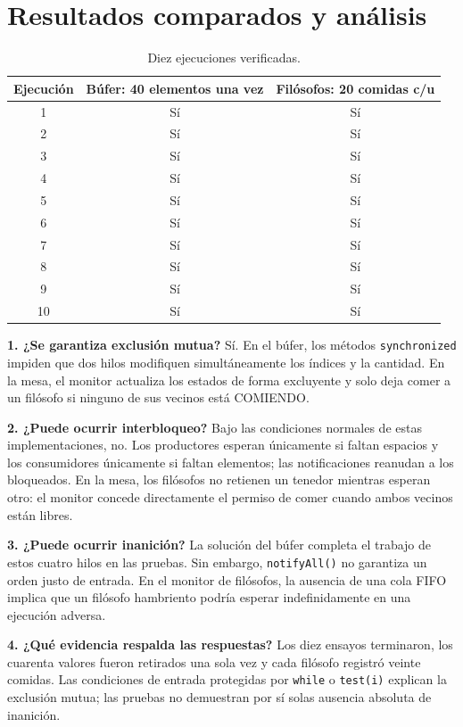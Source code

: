 \documentclass[12pt]{report}
\begin{document}
\chapter{Resultados comparados y análisis}
\begin{table}[H]\centering\caption{Diez ejecuciones verificadas.}
\begin{tabular}{ccc}\toprule
Ejecución & Búfer: 40 elementos una vez & Filósofos: 20 comidas c/u\\\midrule
1 & Sí & Sí\\2 & Sí & Sí\\3 & Sí & Sí\\4 & Sí & Sí\\5 & Sí & Sí\\6 & Sí & Sí\\7 & Sí & Sí\\8 & Sí & Sí\\9 & Sí & Sí\\10 & Sí & Sí\\\bottomrule
\end{tabular}\end{table}

\textbf{1. ¿Se garantiza exclusión mutua?} Sí. En el búfer, los métodos \texttt{synchronized} impiden que dos hilos modifiquen simultáneamente los índices y la cantidad. En la mesa, el monitor actualiza los estados de forma excluyente y solo deja comer a un filósofo si ninguno de sus vecinos está COMIENDO.

\textbf{2. ¿Puede ocurrir interbloqueo?} Bajo las condiciones normales de estas implementaciones, no. Los productores esperan únicamente si faltan espacios y los consumidores únicamente si faltan elementos; las notificaciones reanudan a los bloqueados. En la mesa, los filósofos no retienen un tenedor mientras esperan otro: el monitor concede directamente el permiso de comer cuando ambos vecinos están libres.

\textbf{3. ¿Puede ocurrir inanición?} La solución del búfer completa el trabajo de estos cuatro hilos en las pruebas. Sin embargo, \texttt{notifyAll()} no garantiza un orden justo de entrada. En el monitor de filósofos, la ausencia de una cola FIFO implica que un filósofo hambriento podría esperar indefinidamente en una ejecución adversa.

\textbf{4. ¿Qué evidencia respalda las respuestas?} Los diez ensayos terminaron, los cuarenta valores fueron retirados una sola vez y cada filósofo registró veinte comidas. Las condiciones de entrada protegidas por \texttt{while} o \texttt{test(i)} explican la exclusión mutua; las pruebas no demuestran por sí solas ausencia absoluta de inanición.
\end{document}
